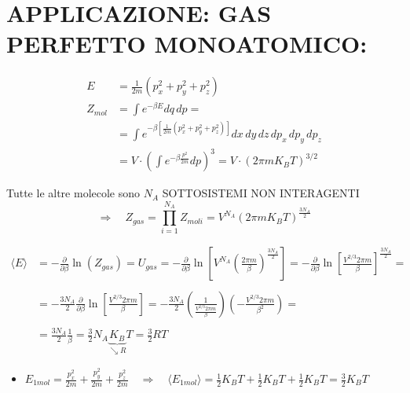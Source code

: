 \documentclass[12pt,a4paper]{article}
\begin{document}
\section*{APPLICAZIONE: GAS PERFETTO MONOATOMICO:}


\begin{align*}
    E &= \frac{1}{2m} (p_x^2 + p_y^2 + p_z^2) \\
    Z_{mol} &= \int e^{-\beta E} dq \, dp = \\
    &= \int e^{-\beta \left[ \frac{1}{2m} (p_x^2 + p_y^2 + p_z^2) \right]} dx \, dy \, dz \, dp_x \, dp_y \, dp_z \\
    &= V \cdot \left( \int e^{-\beta \frac{p^2}{2m}} dp \right)^3 = V \cdot (2\pi m K_B T)^{3/2}
\end{align*}

\vspace{0.3cm}
\noindent Tutte le altre molecole sono $N_A$ SOTTOSISTEMI NON INTERAGENTI
\begin{equation*}
    \Rightarrow \quad Z_{gas} = \prod_{i=1}^{N_A} Z_{moli} = \boxed{ V^{N_A} (2\pi m K_B T)^{\frac{3N_A}{2}} }
\end{equation*}

\begin{align*}
    \langle E \rangle &= - \frac{\partial}{\partial \beta} \ln(Z_{gas}) = U_{gas} = - \frac{\partial}{\partial \beta} \ln \left[ V^{N_A} \left( \frac{2\pi m}{\beta} \right)^{\frac{3N_A}{2}} \right] = - \frac{\partial}{\partial \beta} \ln \left[ \frac{V^{2/3} 2\pi m}{\beta} \right]^{\frac{3N_A}{2}} = \\
    \\
    &= - \frac{3N_A}{2} \frac{\partial}{\partial \beta} \ln \left[ \frac{V^{2/3} 2\pi m}{\beta} \right] = - \frac{3N_A}{2} \left( \frac{1}{\frac{V^{2/3} 2\pi m}{\beta}} \right) \left( - \frac{V^{2/3} 2\pi m}{\beta^2} \right) = \\
    \\
    &= \frac{3N_A}{2} \frac{1}{\beta} = \frac{3}{2} N_A \underbrace{K_B}_{\searrow R} T = \frac{3}{2} R T
\end{align*}

\vspace{0.5cm}
\begin{itemize}
    \item $E_{1 mol} = \frac{p_x^2}{2m} + \frac{p_y^2}{2m} + \frac{p_z^2}{2m} \quad \Rightarrow \quad \langle E_{1 mol} \rangle = \frac{1}{2}K_BT + \frac{1}{2}K_BT + \frac{1}{2}K_BT = \frac{3}{2} K_B T$
\end{itemize}
\end{document}
